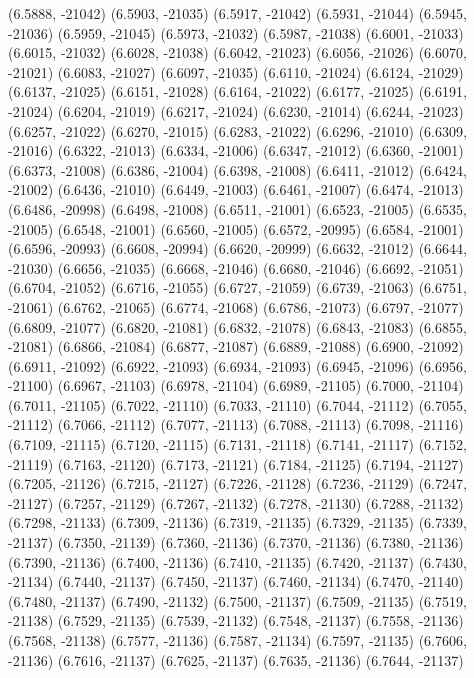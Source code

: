 {(6.5888,	-21042)
(6.5903,	-21035)
(6.5917,	-21042)
(6.5931,	-21044)
(6.5945,	-21036)
(6.5959,	-21045)
(6.5973,	-21032)
(6.5987,	-21038)
(6.6001,	-21033)
(6.6015,	-21032)
(6.6028,	-21038)
(6.6042,	-21023)
(6.6056,	-21026)
(6.6070,	-21021)
(6.6083,	-21027)
(6.6097,	-21035)
(6.6110,	-21024)
(6.6124,	-21029)
(6.6137,	-21025)
(6.6151,	-21028)
(6.6164,	-21022)
(6.6177,	-21025)
(6.6191,	-21024)
(6.6204,	-21019)
(6.6217,	-21024)
(6.6230,	-21014)
(6.6244,	-21023)
(6.6257,	-21022)
(6.6270,	-21015)
(6.6283,	-21022)
(6.6296,	-21010)
(6.6309,	-21016)
(6.6322,	-21013)
(6.6334,	-21006)
(6.6347,	-21012)
(6.6360,	-21001)
(6.6373,	-21008)
(6.6386,	-21004)
(6.6398,	-21008)
(6.6411,	-21012)
(6.6424,	-21002)
(6.6436,	-21010)
(6.6449,	-21003)
(6.6461,	-21007)
(6.6474,	-21013)
(6.6486,	-20998)
(6.6498,	-21008)
(6.6511,	-21001)
(6.6523,	-21005)
(6.6535,	-21005)
(6.6548,	-21001)
(6.6560,	-21005)
(6.6572,	-20995)
(6.6584,	-21001)
(6.6596,	-20993)
(6.6608,	-20994)
(6.6620,	-20999)
(6.6632,	-21012)
(6.6644,	-21030)
(6.6656,	-21035)
(6.6668,	-21046)
(6.6680,	-21046)
(6.6692,	-21051)
(6.6704,	-21052)
(6.6716,	-21055)
(6.6727,	-21059)
(6.6739,	-21063)
(6.6751,	-21061)
(6.6762,	-21065)
(6.6774,	-21068)
(6.6786,	-21073)
(6.6797,	-21077)
(6.6809,	-21077)
(6.6820,	-21081)
(6.6832,	-21078)
(6.6843,	-21083)
(6.6855,	-21081)
(6.6866,	-21084)
(6.6877,	-21087)
(6.6889,	-21088)
(6.6900,	-21092)
(6.6911,	-21092)
(6.6922,	-21093)
(6.6934,	-21093)
(6.6945,	-21096)
(6.6956,	-21100)
(6.6967,	-21103)
(6.6978,	-21104)
(6.6989,	-21105)
(6.7000,	-21104)
(6.7011,	-21105)
(6.7022,	-21110)
(6.7033,	-21110)
(6.7044,	-21112)
(6.7055,	-21112)
(6.7066,	-21112)
(6.7077,	-21113)
(6.7088,	-21113)
(6.7098,	-21116)
(6.7109,	-21115)
(6.7120,	-21115)
(6.7131,	-21118)
(6.7141,	-21117)
(6.7152,	-21119)
(6.7163,	-21120)
(6.7173,	-21121)
(6.7184,	-21125)
(6.7194,	-21127)
(6.7205,	-21126)
(6.7215,	-21127)
(6.7226,	-21128)
(6.7236,	-21129)
(6.7247,	-21127)
(6.7257,	-21129)
(6.7267,	-21132)
(6.7278,	-21130)
(6.7288,	-21132)
(6.7298,	-21133)
(6.7309,	-21136)
(6.7319,	-21135)
(6.7329,	-21135)
(6.7339,	-21137)
(6.7350,	-21139)
(6.7360,	-21136)
(6.7370,	-21136)
(6.7380,	-21136)
(6.7390,	-21136)
(6.7400,	-21136)
(6.7410,	-21135)
(6.7420,	-21137)
(6.7430,	-21134)
(6.7440,	-21137)
(6.7450,	-21137)
(6.7460,	-21134)
(6.7470,	-21140)
(6.7480,	-21137)
(6.7490,	-21132)
(6.7500,	-21137)
(6.7509,	-21135)
(6.7519,	-21138)
(6.7529,	-21135)
(6.7539,	-21132)
(6.7548,	-21137)
(6.7558,	-21136)
(6.7568,	-21138)
(6.7577,	-21136)
(6.7587,	-21134)
(6.7597,	-21135)
(6.7606,	-21136)
(6.7616,	-21137)
(6.7625,	-21137)
(6.7635,	-21136)
(6.7644,	-21137)
}
